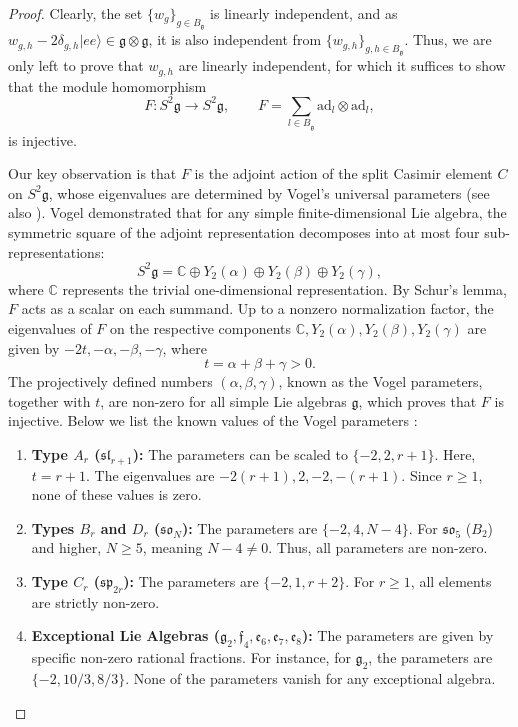 \documentclass[a4paper]{article}
\newcommand{\ket}[1]{\vert #1 \rangle}
\newcommand{\ad}{\mathrm{ad}}
\theoremstyle{definition}
\begin{document}
\begin{proof}
Clearly, the set $\{w_g\}_{g\in B_{\mathfrak{g}}}$ is linearly independent, and as $w_{g,h} - 2\delta_{g,h} \ket{ee} \in \mathfrak{g} \otimes \mathfrak{g}$, it is also independent from  $\{w_{g,h}\}_{g,h\in B_{\mathfrak{g}}}$. Thus, we are only left to prove that $w_{g,h}$ are linearly independent, for which it suffices to show that the module homomorphism 
$$F\colon S^2 \mathfrak{g} \to S^2 \mathfrak{g}, \qquad F = \sum_{l\in B_{\mathfrak{g}}} \ad_{l} \otimes \ad_{l},$$ 
is injective. 

Our key observation is that $F$ is the adjoint action of the split Casimir element $C$ on $S^2 \mathfrak{g}$,
whose eigenvalues are determined by Vogel's universal parameters \cite{vogel1999} (see also \cite{isaev2026vogel}). Vogel demonstrated that for any simple finite-dimensional Lie algebra, the symmetric square of the adjoint representation decomposes into at most four sub-representations:
\begin{equation}
S^2\mathfrak{g} = \mathbb{C} \oplus Y_2(\alpha) \oplus Y_2(\beta) \oplus Y_2(\gamma),
\end{equation}
where $\mathbb{C}$ represents the trivial one-dimensional representation. By Schur's lemma, $F$ acts as a scalar on each summand. Up to a nonzero normalization factor, the eigenvalues of 
$F$  
on the respective components $\mathbb{C}, Y_2(\alpha), Y_2(\beta), Y_2(\gamma)$ are given by $-2t, -\alpha, -\beta, -\gamma$, where 
\begin{equation}
t = \alpha + \beta + \gamma > 0.
\end{equation}
The projectively defined numbers $(\alpha, \beta, \gamma)$, known as the Vogel parameters, together with $t$, are non-zero for all simple Lie algebras $\mathfrak{g}$, which proves that $F$ is injective. Below we list the known values of the Vogel parameters \cite{vogel1999}: 
\begin{enumerate}
\item \textbf{Type $A_r$ ($\mathfrak{sl}_{r+1}$):}
The parameters can be scaled to $\{-2, 2, r+1\}$. Here, $t = r+1$. The eigenvalues are $-2(r+1), 2, -2, -(r+1)$. Since $r \ge 1$, none of these values is zero.
\item \textbf{Types $B_r$ and $D_r$ ($\mathfrak{so}_{N}$):}
The parameters are $\{-2, 4, N-4\}$. For $\mathfrak{so}_5$ ($B_2$) and higher, $N \ge 5$, meaning $N-4 \neq 0$. Thus, all parameters are non-zero.
\item \textbf{Type $C_r$ ($\mathfrak{sp}_{2r}$):}
The parameters are $\{-2, 1, r+2\}$. For $r \ge 1$, all elements are strictly non-zero.
\item \textbf{Exceptional Lie Algebras ($\mathfrak{g}_2, \mathfrak{f}_4, \mathfrak{e}_6, \mathfrak{e}_7, \mathfrak{e}_8$):}
The parameters are given by specific non-zero rational fractions. For instance, for $\mathfrak{g}_2$, the parameters are $\{-2, 10/3, 8/3\}$. None of the parameters vanish for any exceptional algebra.
\end{enumerate}




\end{proof}
\end{document}

